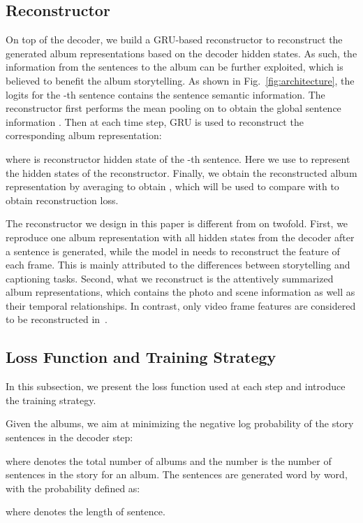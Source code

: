 \documentclass[letterpaper]{article} \usepackage{aaai19}  \usepackage{times}  \usepackage{helvet}  \usepackage{courier}  \usepackage{url}  \usepackage{graphicx}  \usepackage{color}
\begin{document}
\subsection{Reconstructor}
On top of the decoder, we build a GRU-based reconstructor to reconstruct the generated album representations  based on the decoder hidden states.
As such, the information from the sentences to the album can be further exploited, which is believed to benefit the album storytelling.
As shown in Fig.~\ref{fig:architecture},
the logits  for the -th sentence contains the sentence semantic information. The reconstructor first performs the mean pooling on  to obtain the global sentence information . Then at each time step, GRU is used to reconstruct the corresponding album representation:

where  is reconstructor hidden state of the -th sentence.
Here we use  to represent the hidden states of the reconstructor. Finally, we obtain the reconstructed album representation by averaging  to obtain , which will be used to
compare with  to obtain reconstruction loss.

The reconstructor we design in this paper is different from \cite{wang2018reconstruction} on twofold. First, we reproduce one album representation with all hidden states from the decoder after a sentence is generated, while the model in \cite{wang2018reconstruction} needs to reconstruct the feature of each frame. This is mainly attributed to the differences between storytelling and captioning tasks. Second, what we reconstruct is the attentively summarized album representations, which contains the photo and scene information as well as their temporal relationships. In contrast, only video frame features are considered to be reconstructed in~\cite{wang2018reconstruction}.

\subsection{Loss Function and Training Strategy}
In this subsection, we present the loss function used at each step and introduce the training strategy.


Given the albums, we aim at minimizing the negative log probability of the story sentences in the decoder step:

where  denotes the total number of albums and the number  is the number of sentences in the story for an album. The sentences  are generated word by word, with the probability defined  as:

where  denotes the length of sentence.
\end{document}
